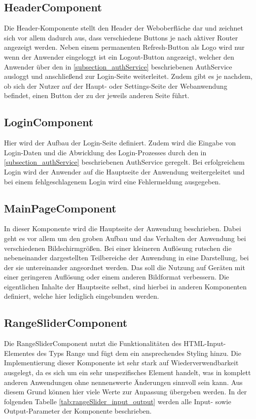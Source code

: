 \subsection{HeaderComponent}
Die Header-Komponente stellt den Header der Weboberfläche dar und zeichnet sich vor allem dadurch aus, dass verschiedene Buttons je nach aktiver Router angezeigt werden. Neben einem permanenten Refresh-Button als Logo wird nur wenn der Anwender eingeloggt ist ein Logout-Button angezeigt, welcher den Anwender über den in \ref{subsection_authService} beschriebenen AuthService ausloggt und anschließend zur Login-Seite weiterleitet. Zudem gibt es je nachdem, ob sich der Nutzer auf der Haupt- oder Settings-Seite der Webanwendung befindet, einen Button der zu der jeweils anderen Seite führt.

\subsection{LoginComponent}
Hier wird der Aufbau der Login-Seite definiert. Zudem wird die Eingabe von Login-Daten und die Abwicklung des Login-Prozesses durch den in \ref{subsection_authService} beschriebenen AuthService geregelt. Bei erfolgreichem Login wird der Anwender auf die Hauptseite der Anwendung weitergeleitet und bei einem fehlgeschlagenem Login wird eine Fehlermeldung ausgegeben.

\subsection{MainPageComponent}
\label{subsection_mainPageComponent}
In dieser Komponente wird die Hauptseite der Anwendung beschrieben. Dabei geht es vor allem um den groben Aufbau und das Verhalten der Anwendung bei verschiedenen Bildschirmgrößen. Bei einer kleineren Auflösung rutschen die nebeneinander dargestellten Teilbereiche der Anwendung in eine Darstellung, bei der sie untereinander angeordnet werden. Das soll die Nutzung auf Geräten mit einer geringeren Auflösung oder einem anderen Bildformat verbessern. Die eigentlichen Inhalte der Hauptseite selbst, sind hierbei in anderen Komponenten definiert, welche hier lediglich eingebunden werden.

\subsection{RangeSliderComponent}
\label{subsection_rangeSliderComponent}
Die RangeSliderComponent nutzt die Funktionalitäten des \acs{HTML}-Input-Elementes des Typs Range und fügt dem ein ansprechendes Styling hinzu. Die Implementierung dieser Komponente ist sehr stark auf Wiederverwendbarkeit ausgelegt, da es sich um ein sehr unspezifisches Element handelt, was in komplett anderen Anwendungen ohne nennenswerte Änderungen sinnvoll sein kann. Aus diesem Grund können hier viele Werte zur Anpassung übergeben werden.
In der folgenden Tabelle \ref{tab:rangeSlider_input_output} werden alle Input- sowie Output-Parameter der Komponente beschrieben.

